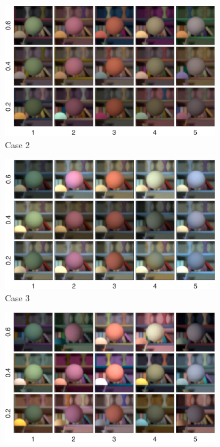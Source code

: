 \documentclass{jov}
\begin{document}
\begin{figure}
\centering
	\begin{subfigure}[b]{0.33 \textwidth}
		\includegraphics[width=\textwidth]{../Figures/Figure2/Figure2_a.jpeg}
		\caption{Case 2}
 		\label{fig:backgroundVarying}
	\end{subfigure}
	\begin{subfigure}[b]{0.33 \textwidth}
        \includegraphics[width=\textwidth]{../Figures/Figure2/Figure2_b.jpeg}
        \caption{Case 3}
        \label{fig:targetIlluminantVarying}
    \end{subfigure}
	\begin{subfigure}[b]{0.33 \textwidth}
        \includegraphics[width=\textwidth]{../Figures/Figure2/Figure2_c.jpeg}

\end{subfigure}
\end{figure}
\end{document}
